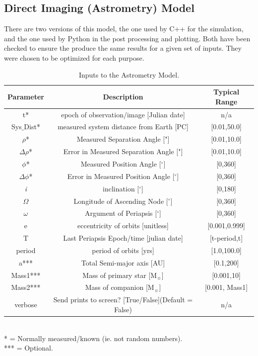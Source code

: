 \documentclass[12pt,preprint]{aastex}
\begin{document}
\subsection{Direct Imaging (Astrometry) Model}
There are two versions of this model, the one used by C++ for the simulation, and the one used by Python in the post processing and plotting.  Both have been checked to ensure the produce the same results for a given set of inputs.  They were chosen to be optimized for each purpose.
\begin{table}[h]
\centering
\caption{ Inputs to the Astrometry Model.}
\begin{tabular}{c c c}
\hline\hline
Parameter & Description & Typical Range \\
\hline
t* & epoch of observation/image [Julian date] & n/a\\
Sys$\_$Dist* & measured system distance from Earth [PC] &  [0.01,50.0]\\
$\rho$* & Measured Separation Angle ["] & [0.01,10.0]\\
$\Delta\rho$* & Error in Measured Separation Angle ["] & [0.01,10.0]\\
$\phi$*  & Measured Position Angle  [$^{\circ}$] & [0,360]\\
$\Delta\phi$*  & Error in Measured Position Angle  [$^{\circ}$] & [0,360]\\
{\it i} & inclination [$^{\circ}$] & [0,180]\\
$\Omega$ & Longitude of Ascending Node [$^{\circ}$] & [0,360]\\
$\omega$ & Argument of Periapsis [$^{\circ}$] & [0,360]\\
e & eccentricity of orbits [unitless] & [0.001,0.999]\\
T & Last Periapsis Epoch/time [julian date] & [t-period,t]\\
period & period of orbits [yrs] & [1.0,100.0]\\
a*** & Total Semi-major axis [AU]  & [0.1,200] \\
Mass1*** & Mass of primary star [M$_{\sun}$] & [0.001,10] \\
Mass2*** & Mass of companion [M$_{\sun}$] & [0.001, Mass1] \\
verbose & Send prints to screen? [True/False](Default = False) & n/a\\
\hline
\end{tabular}
\\
 * = Normally measured/known (ie. not random numbers).\\
 *** = Optional.
\end{table}
\end{document}
